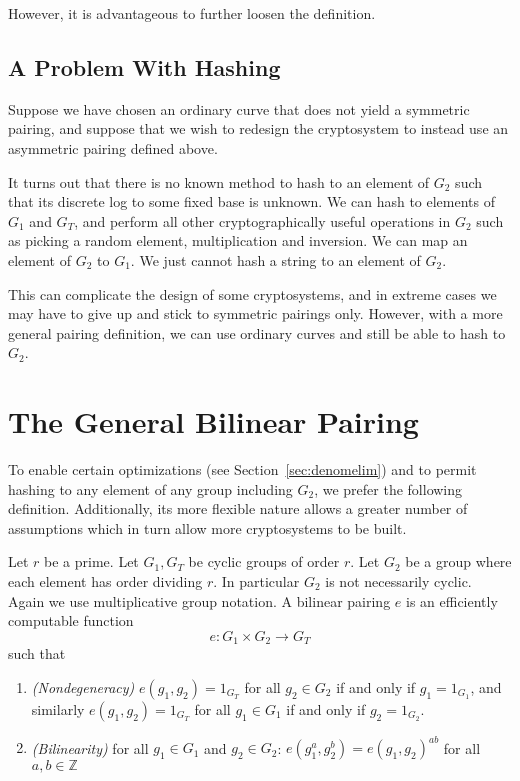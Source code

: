 However, it is advantageous to further loosen the definition.

\subsection{A Problem With Hashing}

Suppose we have chosen an ordinary curve that does not yield a symmetric
pairing, and suppose that we wish to redesign the cryptosystem to instead use
an asymmetric pairing defined above.

It turns out that there is no known method to hash to an element of $G_2$ such
that its discrete log to some fixed base is unknown. We can hash to elements of
$G_1$ and $G_T$, and perform all other cryptographically useful operations in
$G_2$ such as picking a random element, multiplication and inversion. We can
map an element of $G_2$ to $G_1$. We just cannot hash a string to an element of
$G_2$.

This can complicate the design of some cryptosystems, and in extreme
cases we may have to give up and stick to symmetric pairings only. However,
with a more general pairing definition, we can use ordinary curves and still be
able to hash to $G_2$.

\section{\label{sec:generalpairing}The General Bilinear Pairing}

To enable certain optimizations (see Section~\ref{sec:denomelim}) and
to permit hashing to any element of any group including $G_2$,
we prefer the following definition. Additionally, its more flexible nature
allows a greater number of assumptions which in turn allow more
cryptosystems to be built.

Let $r$ be a prime.
Let $G_1, G_T$ be cyclic groups of order $r$.
Let $G_2$ be a group where each element has order dividing $r$.
In particular $G_2$ is not necessarily cyclic.
Again we use multiplicative group notation.
A bilinear pairing $e$ is an efficiently computable function
\[
e:G_1 \times G_2 \rightarrow G_T
\]
such that
\begin{enumerate}
\item
\emph{(Nondegeneracy)}
$e(g_1,g_2) = 1_{G_T}$ for all $g_2 \in G_2$ if and only if $g_1 = 1_{G_1}$,
and similarly 
$e(g_1,g_2) = 1_{G_T}$ for all $g_1 \in G_1$ if and only if $g_2 = 1_{G_2}$.
\item
\emph{(Bilinearity)}
for all $g_1 \in G_1$ and $g_2 \in G_2$:
$e(g_1^a, g_2^b) = e(g_1,g_2)^{a b}$ for all $a, b \in \mathbb{Z}$
\end{enumerate}


